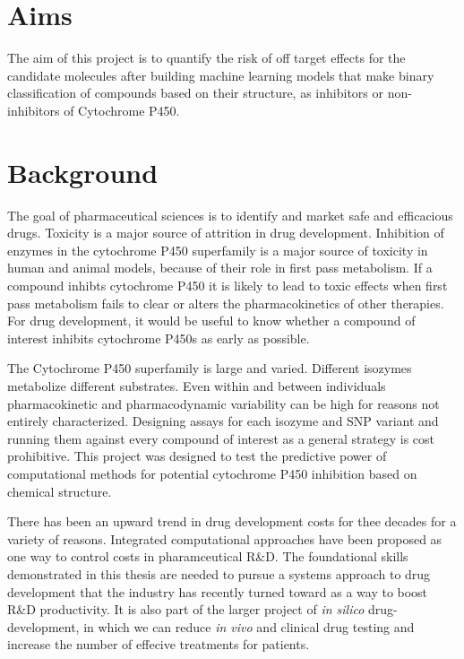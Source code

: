 \section{Aims}
The aim of this project is to quantify the risk of off target effects for the candidate molecules after building machine learning models that make binary classification of compounds based on their structure, as inhibitors or non-inhibitors of Cytochrome P450.

\section{Background}
The goal of pharmaceutical sciences is to identify and market safe and efficacious drugs. Toxicity is a major source of attrition in drug development. Inhibition of enzymes in the cytochrome P450 superfamily is a major source of toxicity in human and animal models, because of their role in first pass metabolism. If a compound inhibts cytochrome P450 it is likely to lead to toxic effects when first pass metabolism fails to clear or alters the pharmacokinetics of other therapies. For drug development, it would be useful to know whether a compound of interest inhibits cytochrome P450s as early as possible.

The Cytochrome P450 superfamily is large and varied. Different isozymes metabolize different substrates. Even within and between individuals pharmacokinetic and pharmacodynamic variability can be high for reasons not entirely characterized. Designing assays for each isozyme and SNP variant and running them against every compound of interest as a general strategy is cost prohibitive. This project was designed to test the predictive power of computational methods for potential cytochrome P450 inhibition based on chemical structure.

There has been an upward trend in drug development costs for thee decades for a variety of reasons. Integrated computational approaches have been proposed as one way to control costs in pharamceutical R\&D. \cite{Visser2014} The foundational skills demonstrated in this thesis are needed to pursue a systems approach to drug development that the industry has recently turned toward as a way to boost R\&D productivity.\cite{Visser2014,Berg2014} It is also part of the larger project of \textit{in silico} drug-development, in which we can reduce \textit{in vivo} and clinical drug testing and increase the number of effecive treatments for patients.

